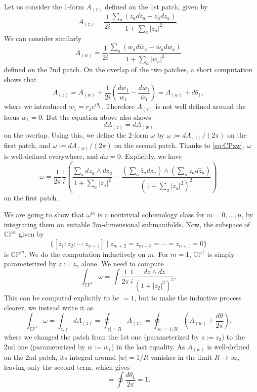 \documentclass[12pt]{article}
\numberwithin{equation}{section}
\numberwithin{figure}{section}
\theoremstyle{remark}
\let\bar\overline
\def\CP{\mathbb{CP}}
\begin{document}
Let us consider the 1-form $A_{(z)}$ defined on the 1st patch, given by \begin{equation}
A_{(z)} =  \frac{1}{2i} \frac{\sum_a (z_a d\bar z_a-\bar z_a dz_a)}{1+\sum_a |z_a|^2}.
\label{eq:CPnConn1}
\end{equation} 
We can consider similarly \begin{equation}
A_{(w)} =  \frac{1}{2i} \frac{\sum_a (w_a d\bar w_a-\bar w_a dw_a)}{1+\sum_a |w_a|^2}
\label{eq:CPnConn2}
\end{equation}  defined on the 2nd patch.
On the overlap of the two patches, a short computation shows that \begin{equation}
A_{(z)}=A_{(w)} + \frac{1}{2i} (\frac{dw_1}{w_1}-\frac{d\bar w_1}{\bar w_1})
=A_{(w)} + {d\theta_1},
\label{eq:CPnConn3}
\end{equation}
where we introduced $w_1=r_1 e^{i\theta_1}$.  
Therefore $A_{(z)}$ is not well defined around the locus $w_1=0$.
But the equation above also shows \begin{equation}
dA_{(z)}=dA_{(w)} \label{eq:CPzw}
\end{equation} on the overlap. 
Using this, we define the 2-form $\omega$ by $
\omega := dA_{(z)} /(2\pi)
$ on the first patch,
and $
\omega:=dA_{(w)}/(2\pi)
$ on the second patch. 
Thanks to \eqref{eq:CPzw}, $\omega$ is well-defined everywhere, and $d\omega=0$.
Explicitly, we have
\begin{equation}
\omega = \frac{1}{2\pi}\frac{1}{i} \left(
\frac{\sum_a dz_a \wedge d\bar z_a}{1+\sum_a |z_a|^2}
-\frac{(\sum_a \bar z_a dz_a) \wedge (\sum_a z_a d\bar z_a)}{(1+\sum_a |z_a|^2)^2}
\right)
\label{eq:CPnConn4}
\end{equation} on the first patch.

We are going to show that $\omega^m$ is a nontrivial cohomology class for $m=0,\ldots, n$, by integrating them on suitable $2m$-dimensional submanifolds.
Now, the subspace of $\CP^n$ given by \begin{equation}
\{ [z_1:z_2:\cdots:z_{n+1}] \mid  z_{m+2}=z_{m+3}=\cdots=z_{n+1}=0\} 
\end{equation} is  $\CP^m$.
We do the computation inductively on $m$.
For $m=1$, $\CP^1$ is simply parameterized by $z:=z_2$ alone. We need to compute \begin{equation}
\int_{\CP^1} \omega = \int \frac1{2\pi} \frac{1}{i} \frac{dz \wedge d\bar z}{(1+|z_2|^2)^2} .
\end{equation} This can be computed explicitly to be $=1$, 
but to make the inductive process clearer, we instead write it as \begin{equation}
\int_{\CP^1} \omega= \int_{z,\bar z} dA_{(z)} = \oint_{|z|=R} A_{(z)}
= \oint_{|w|=1/R} (A_{(w)} + \frac{d\theta}{2\pi}).
\end{equation} where we changed the patch from the 1st one (parameterized by $z:=z_2$)  to 
the 2nd one (parameterized by $w:=w_1$) in the last equality.
As $A_{(w)}$ is well-defined on the 2nd patch, its integral around $|w|=1/R$ vanishes in the limit $R\to \infty$, leaving only the second term, which gives \begin{equation}
= \oint \frac{d\theta_1}{2\pi} = 1.
\end{equation}
\end{document}
